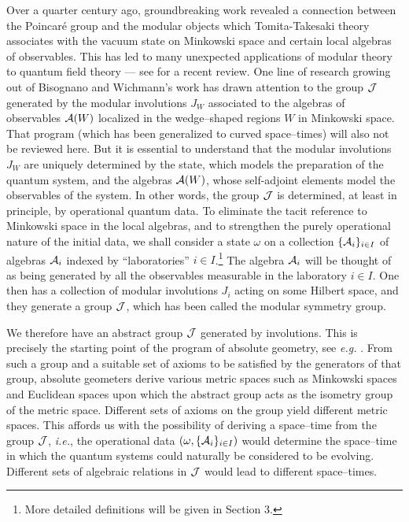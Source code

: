 \documentclass[a4paper,twoside,12pt]{article}
\def\inet{{\{\As_i \}_{i \in I}}}
\def\As{{\cal A}}
\def\Js{{\cal J}}
\begin{document}
     Over a quarter century ago, groundbreaking work \cite{BW}
revealed a connection between the Poincar\'e group and the modular
objects which Tomita-Takesaki theory \cite{Tak,BR,KR} associates with
the vacuum state on Minkowski space and certain local algebras of
observables. This has led to many unexpected applications of modular
theory to quantum field theory --- see \cite{Bor} for a recent
review. One line of research \cite{BS,Sum,BFS1,BDFS,BS2} growing out of
Bisognano and Wichmann's work has drawn attention to the group $\Js$
generated by the modular involutions $J_W$ associated to the algebras
of observables $\As(W)$ localized in the wedge--shaped regions $W$ in
Minkowski space. That program (which has been generalized to curved
space--times) will also not be reviewed here. But it is essential to
understand that the modular involutions $J_W$ are uniquely determined
by the state, which models the preparation of the quantum system, and
the algebras $\As(W)$, whose self-adjoint elements model the
observables of the system. In other words, the group $\Js$ is
determined, at least in principle, by operational quantum data. To
eliminate the tacit reference to Minkowski space in the local
algebras, and to strengthen the purely operational nature of the
initial data, we shall consider a state $\omega$ on a collection $\inet$ 
of algebras $\As_i$ indexed by ``laboratories''
$i \in I$.\footnote{More detailed definitions will be given in Section
3.} The algebra $\As_i$ will be thought of as being generated by all
the observables measurable in the laboratory $i \in I$. One then has a
collection of modular involutions $J_i$ acting on some Hilbert space,
and they generate a group $\Js$, which has been called the modular
symmetry group.

     We therefore have an abstract group $\Js$ generated by
involutions.  This is precisely the starting point of the program of
absolute geometry, see {\it e.g.} \cite{Ah,Ba,BBPW}. From such a group
and a suitable set of axioms to be satisfied by the generators of that
group, absolute geometers derive various metric spaces such as
Minkowski spaces and Euclidean spaces upon which the abstract group
acts as the isometry group of the metric space. Different sets of
axioms on the group yield different metric spaces. This affords us with
the possibility of deriving a space--time from the group $\Js$, 
{\it i.e.}, the operational data $(\omega,\inet)$ 
would determine the space--time in which the quantum systems could 
naturally be considered to be evolving. Different sets of algebraic
relations in $\Js$ would lead to different space--times.
\end{document}
